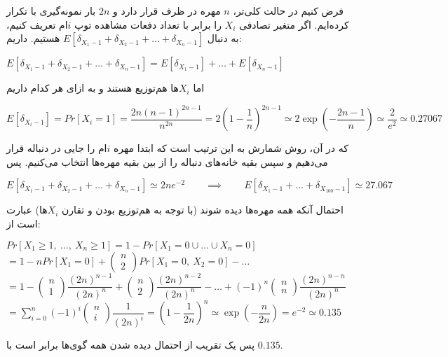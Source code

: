 \documentclass{scribe-cgenomics}
\begin{document}
\begin{حل}
فرض کنیم در حالت کلی‌تر،
$n$
مهره در ظرف قرار دارد و
$2n$
بار نمونه‌گیری با تکرار کرده‌ایم. اگر متغیر تصادفی
$X_i$
را برابر با تعداد دفعات مشاهده توپ
$i$ام
تعریف کنیم، به دنبال
$E[\delta_{X_1-1} + \delta_{X_2-1} + \dots + \delta_{X_n-1}]$
هستیم. داریم:

\begin{center}
$
E[\delta_{X_1-1} + \delta_{X_2-1} + \dots + \delta_{X_n-1}]
= E[\delta_{X_1-1}] + \dots + E[\delta_{X_n-1}]
$
\end{center}

اما
$X_i$ها
هم‌توزیع هستند و به ازای هر کدام داریم

\begin{center}
$
E[\delta_{X_i-1}] = Pr[X_i = 1]
= \dfrac{2n (n-1)^{2n-1}}{n^{2n}}
= 2(1-\dfrac{1}{n})^{2n-1}
\simeq 2\exp({-\dfrac{2n-1}{n}})
\simeq \dfrac{2}{e^2} 
\simeq 0.27067
$
\end{center}

که در آن، روش شمارش به این ترتیب است که ابتدا مهره
$i$ام
را جایی در دنباله قرار می‌دهیم و سپس بقیه خانه‌های دنباله را از بین بقیه مهره‌ها انتخاب می‌کنیم. پس

\begin{center}
$
E[\delta_{X_1-1} + \delta_{X_2-1} + \dots + \delta_{X_n-1}]
\simeq 2ne^{-2} 
\qquad \implies \qquad
E[\delta_{X_1-1} + \dots + \delta_{X_{100}-1}]
\simeq 27.067
$
\end{center}

\vspace*{1in}

احتمال آنکه همه مهره‌ها دیده شوند (با توجه به هم‌توزیع بودن و تقارن
$X_i$ها)
عبارت است از:

\begin{center}
$
Pr[X_1\geq 1,\ \dots,\ X_n\geq 1]
= 1 - Pr[X_1=0 \cup \dots \cup X_n=0]
$
\bigbreak
$= 1 - nPr[X_1=0]
+\begin{pmatrix}
n\\ 2
\end{pmatrix}
Pr[X_1=0,\ X_2=0] -\dots
$
\bigbreak
$
=
1 - 
\begin{pmatrix}
n\\1
\end{pmatrix}
\dfrac{(2n)^{n-1}}{(2n)^n}
+
\begin{pmatrix}
n\\2
\end{pmatrix}
\dfrac{(2n)^{n-2}}{(2n)^n}
- \dots +
(-1)^n \begin{pmatrix}
n\\n
\end{pmatrix}
\dfrac{(2n)^{n-n}}{(2n)^n}
$
\bigbreak
$
= \sum_{i=0}^{n}(-1)^i \begin{pmatrix}
n\\i
\end{pmatrix}
\dfrac{1}{(2n)^i}
= (1 - \dfrac{1}{2n})^n
\simeq \exp(-\dfrac{n}{2n}) 
= e^{-2} \simeq 0.135
$
\end{center}

پس یک تقریب از احتمال دیده شدن همه گوی‌ها برابر است با
$0.135$.

\end{حل}
\end{document}
